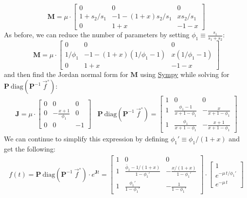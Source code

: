\documentclass{article}
\newcommand{\finit}{\vec{f}^\circ}
\begin{document}
\[
\mathbf{M} = \mu \cdot 
    \begin{bmatrix}
        0 & 0 & 0  \\
        1 + s_2/s_1 & - 1 - (1+x) s_2 / s_1 & x s_2 / s_1 \\
        0 & 1+x  & -1-x
    \end{bmatrix}
\]
As before, we can reduce the number of parameters by setting $\phi_1 \equiv \frac{s_1}{s_1+s_2}$:
\[
\mathbf{M} = \mu \cdot 
    \begin{bmatrix}
        0 & 0 & 0  \\
        1/\phi_1 & - 1 - (1+x)(1/\phi_1-1) & x (1/\phi_1-1) \\
        0 & 1+x  & -1-x
    \end{bmatrix}
\]
and then find the Jordan normal form for $\mathbf{M}$ using \href{https://www.sympy.org/}{Sympy} while solving for $\mathbf{P}~\text{diag}\left(\mathbf{P}^{-1} ~\finit\right)$:
\begin{eqnarray}
\mathbf{J} = \mu \cdot
  \begin{bmatrix}
    0 & 0 & 0 \\
    0 & -\frac{x+1}{\phi_1} & 0 \\
    0 & 0 & -1
\end{bmatrix}
~~~~
\mathbf{P}~\text{diag}\left(\mathbf{P}^{-1} ~\finit\right) =
    \begin{bmatrix}
        1 & 0 & 0 \\
        1 & \frac{\phi_1 - 1}{x + 1 - \phi_1} & -\frac{x}{x + 1 - \phi_1} \\
        1 & \frac{\phi_1}{x + 1 - \phi_1} & -\frac{x+1}{x + 1 - \phi_1} 
    \end{bmatrix}
\end{eqnarray}
We can continue to simplify this expression by defining $\phi_1' \equiv \phi_1/(1+x)$ and get the following:
\begin{eqnarray}
    f(t) = \mathbf{P}~\text{diag}\left(\mathbf{P}^{-1} ~\finit\right) \cdot e^{\mathbf{J}t} = 
    \begin{bmatrix}
        1 & 0 & 0 \\
        1 & \frac{\bar{\phi}_1 - 1/(1+x)}{1 - \phi_1'} & -\frac{x/(1+x)}{1 - \phi_1'} \\
        1 & \frac{\phi_1'}{1 - \phi_1'} & -\frac{1}{1 - \phi_1'}
    \end{bmatrix} \cdot 
    \begin{bmatrix}
        1 \\
        e^{-\mu\,t / \phi_1'} \\
        e^{-\mu\,t}
    \end{bmatrix}
\end{eqnarray}
\end{document}
